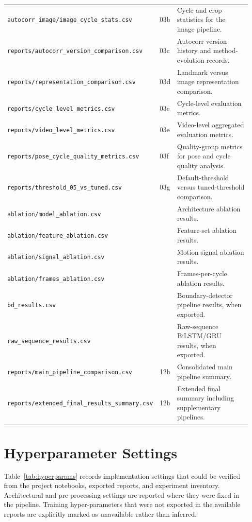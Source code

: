 \begin{table}[htbp]
\begin{tabularx}{\textwidth}{
>{\raggedright\arraybackslash}p{}
>{\raggedright\arraybackslash}p{}
>{\raggedright\arraybackslash}X}
\texttt{autocorr\_image/image\_cycle\_stats.csv} & 03b & Cycle and crop statistics for the image pipeline. \\
\texttt{reports/autocorr\_version\_comparison.csv} & 03c & Autocorr version history and method-evolution records. \\
\texttt{reports/representation\_comparison.csv} & 03d & Landmark versus image representation comparison. \\
\texttt{reports/cycle\_level\_metrics.csv} & 03e & Cycle-level evaluation metrics. \\
\texttt{reports/video\_level\_metrics.csv} & 03e & Video-level aggregated evaluation metrics. \\
\texttt{reports/pose\_cycle\_quality\_metrics.csv} & 03f & Quality-group metrics for pose and cycle quality analysis. \\
\texttt{reports/threshold\_05\_vs\_tuned.csv} & 03g & Default-threshold versus tuned-threshold comparison. \\
\texttt{ablation/model\_ablation.csv} & 04 & Architecture ablation results. \\
\texttt{ablation/feature\_ablation.csv} & 05 & Feature-set ablation results. \\
\texttt{ablation/signal\_ablation.csv} & 06 & Motion-signal ablation results. \\
\texttt{ablation/frames\_ablation.csv} & 07 & Frames-per-cycle ablation results. \\
\texttt{bd\_results.csv} & 08 & Boundary-detector pipeline results, when exported. \\
\texttt{raw\_sequence\_results.csv} & 09 & Raw-sequence BiLSTM/GRU results, when exported. \\
\texttt{reports/main\_pipeline\_comparison.csv} & 12b & Consolidated main pipeline summary. \\
\texttt{reports/extended\_final\_results\_summary.csv} & 12b & Extended final summary including supplementary pipelines. \\
\bottomrule
\end{tabularx}
\end{table}

\section{Hyperparameter Settings}
\label{app:hyperparams}

Table~\ref{tab:hyperparams} records implementation settings that could be
verified from the project notebooks, exported reports, and experiment inventory.
Architectural and pre-processing settings are reported where they were fixed in
the pipeline. Training hyper-parameters that were not exported in the available
reports are explicitly marked as unavailable rather than inferred.

